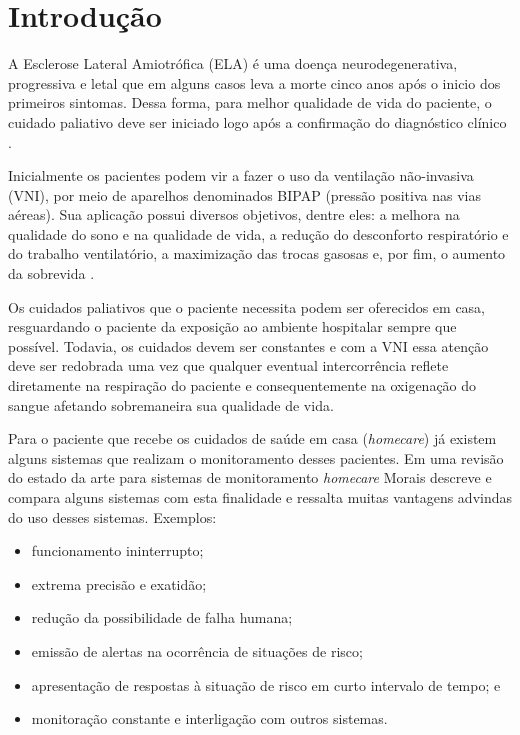 \documentclass[conference,harvard,brazil,english]{sbatex}
\begin{document}


\section{Introdução}

A Esclerose Lateral Amiotrófica (ELA) é uma doença neurodegenerativa, progressiva e letal que em alguns casos leva a morte cinco anos após o inicio dos primeiros sintomas. Dessa forma, para melhor qualidade de vida do paciente, o cuidado paliativo deve ser iniciado logo após a confirmação do diagnóstico clínico \cite{presto2009ventilacao}. 

Inicialmente os pacientes podem vir a fazer o uso da ventilação não-invasiva (VNI), por meio de aparelhos denominados BIPAP (pressão positiva nas vias aéreas). Sua aplicação possui diversos objetivos, dentre eles: a melhora na qualidade do sono e na qualidade de vida, a redução do desconforto respiratório e do trabalho ventilatório, a maximização das trocas gasosas e, por fim, o aumento da sobrevida \cite{fonseca2010proposta}.

Os cuidados paliativos que o paciente necessita podem ser oferecidos em casa, resguardando o paciente da exposição ao ambiente hospitalar sempre que possível. Todavia, os cuidados devem ser constantes e com a VNI essa atenção deve ser redobrada uma vez que qualquer eventual intercorrência reflete diretamente na respiração do paciente e consequentemente na oxigenação do sangue afetando sobremaneira sua qualidade de vida.

Para o paciente que recebe os cuidados de saúde em casa (\textit{homecare}) já existem alguns sistemas que realizam o monitoramento desses pacientes. Em uma revisão do estado da arte para sistemas de monitoramento \textit{homecare} \cite{de2012esclerose} Morais descreve e compara alguns sistemas com esta finalidade e ressalta muitas
vantagens  advindas  do  uso  desses  sistemas. Exemplos:
\begin{itemize}
    \item funcionamento ininterrupto;
    \item extrema precisão e exatidão;
    \item redução da possibilidade de  falha  humana;
    \item emissão de alertas na ocorrência de  situações de  risco;
    \item apresentação de respostas à situação  de risco em curto intervalo de tempo; e
    \item monitoração constante  e interligação  com  outros sistemas.
\end{itemize}
\end{document}
